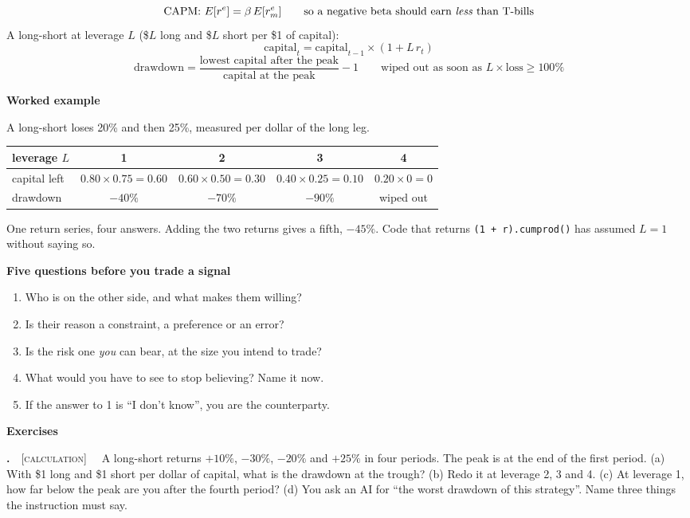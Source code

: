 \documentclass[11pt]{article}
\newcounter{ex}[section]
\renewcommand{\theex}{\thesection.\arabic{ex}}
\newenvironment{ex}[1][calculation]{\refstepcounter{ex}\par\medskip\textbf{\theex}\ \ {\small\textsc{[#1]}}\ \ }{\par}
\newcommand{\head}[1]{\par\medskip\textbf{#1}\par}
\newcommand{\re}{r^{e}}
\begin{document}
\begin{keybox}
\[ \text{CAPM: } E[\re] = \beta\,E[\re_{m}] \qquad \text{so a negative beta should earn \emph{less} than T-bills} \]
A long-short at leverage $L$ (\$$L$ long and \$$L$ short per \$1 of capital):
\[ \text{capital}_{t} = \text{capital}_{t-1}\times(1 + L\,r_{t}) \]
\[ \text{drawdown} = \frac{\text{lowest capital after the peak}}{\text{capital at the peak}} - 1
   \qquad \text{wiped out as soon as } L \times \text{loss} \ge 100\% \]
\end{keybox}

\head{Worked example}
A long-short loses 20\% and then 25\%, measured per dollar of the long leg.
\begin{center}
\begin{tabular}{lcccc}
\toprule
leverage $L$ & 1 & 2 & 3 & 4 \\
\midrule
capital left & $0.80\times 0.75 = 0.60$ & $0.60\times 0.50 = 0.30$ & $0.40\times 0.25 = 0.10$ & $0.20\times 0 = 0$ \\
drawdown & $-40\%$ & $-70\%$ & $-90\%$ & wiped out \\
\bottomrule
\end{tabular}
\end{center}
One return series, four answers. Adding the two returns gives a fifth, $-45\%$. Code that returns
\texttt{(1 + r).cumprod()} has assumed $L = 1$ without saying so.

\head{Five questions before you trade a signal}
\begin{enumerate}[itemsep=1pt]
\item Who is on the other side, and what makes them willing?
\item Is their reason a constraint, a preference or an error?
\item Is the risk one \emph{you} can bear, at the size you intend to trade?
\item What would you have to see to stop believing? Name it now.
\item If the answer to 1 is ``I don't know'', you are the counterparty.
\end{enumerate}

\head{Exercises}

\begin{ex}\label{ex:9.1}
A long-short returns $+10\%$, $-30\%$, $-20\%$ and $+25\%$ in four periods. The peak is at the end of the first period.
(a) With \$1 long and \$1 short per dollar of capital, what is the drawdown at the trough? (b) Redo it at leverage 2, 3
and 4. (c) At leverage 1, how far below the peak are you after the fourth period? (d) You ask an AI for ``the worst
drawdown of this strategy''. Name three things the instruction must say.
\end{ex}
\end{document}
